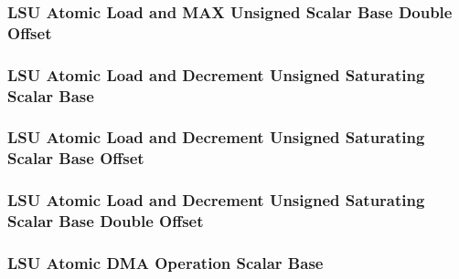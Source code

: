 

\subsubsection[{\small LSU Atomic Load and MAX Unsigned Scalar Base Double Offset}]{LSU Atomic Load and MAX Unsigned Scalar Base Double Offset} \label{sec:format-LSU-ALMAXUSB.D}



\subsubsection[{\small LSU Atomic Load and Decrement Unsigned Saturating Scalar Base}]{LSU Atomic Load and Decrement Unsigned Saturating Scalar Base} \label{sec:format-LSU-ALDUSSB}



\subsubsection[{\small LSU Atomic Load and Decrement Unsigned Saturating Scalar Base Offset}]{LSU Atomic Load and Decrement Unsigned Saturating Scalar Base Offset} \label{sec:format-LSU-ALDUSSB.O}



\subsubsection[{\small LSU Atomic Load and Decrement Unsigned Saturating Scalar Base Double Offset}]{LSU Atomic Load and Decrement Unsigned Saturating Scalar Base Double Offset} \label{sec:format-LSU-ALDUSSB.D}



\subsubsection[{\small LSU Atomic DMA Operation Scalar Base}]{LSU Atomic DMA Operation Scalar Base} \label{sec:format-LSU-ADMAQSB}

